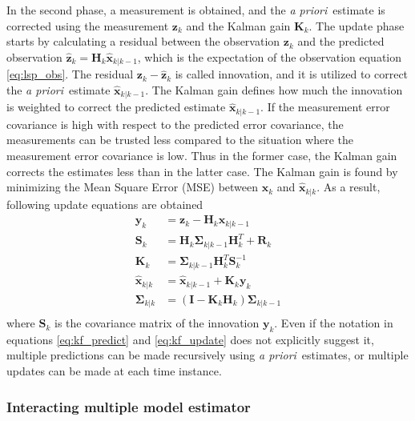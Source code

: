 \documentclass[english, 12pt, a4paper, elec, utf8, a-1b, online]{aaltothesis}
\renewcommand{\vec}[1]{\mathbf{#1}}
\newcommand{\inv}[1]{#1^{-1}}
\newcommand{\xprior}{\hat{\vec{x}}_{k|k-1}}
\newcommand{\xpost}{\hat{\vec{x}}_{k|k}}
\newcommand{\priorecov}{\boldsymbol{\Sigma}_{k|k-1}}
\newcommand{\postecov}{\boldsymbol{\Sigma}_{k|k}}
\newcommand{\prefitinnov}{\vec{y}_k}
\newcommand{\x}{\vec{x}_k}
\newcommand{\z}{\vec{z}_k}
\newcommand{\omodel}{\vec{H}_k}
\newcommand{\ocov}{\vec{R}_k}
\newcommand{\innocov}{\vec{S}_k}
\newcommand{\eye}{\vec{I}}
\newcommand{\gain}{\vec{K}_k}
\def\prior{\textit{a priori}\ }
\newcommand{\zhat}{\hat{\vec{z}}_k}
\begin{document}
In the second phase, a measurement is obtained, and the \prior estimate is corrected using the measurement $\z$ and the Kalman gain $\gain$.
The update phase starts by calculating a residual between the observation $\z$ and the predicted observation $\zhat = \omodel \xprior$, which is the expectation of the observation equation \eqref{eq:lsp_obs}.
The residual $\z-\zhat$ is called innovation, and it is utilized to correct the \prior estimate $\xprior$.
The Kalman gain defines how much the innovation is weighted to correct the predicted estimate $\xprior$.
If the measurement error covariance is high with respect to the predicted error covariance, the measurements can be trusted less compared to the situation where the measurement error covariance is low.
Thus in the former case, the Kalman gain corrects the estimates less than in the latter case.
The Kalman gain is found by minimizing the Mean Square Error (MSE) between $\x$ and $\xpost$.
As a result, following update equations are obtained \cite{Zarchan2000}
\begin{subequations}
\label{eq:kf_update}
\begin{align}
    \prefitinnov &= \z - \omodel \xprior \label{eq:kf_prefit_innov}\\ 
    \innocov &= \omodel \priorecov \omodel^T + \ocov \label{eq:kf_innov_cov}\\ 
    \gain &= \priorecov \omodel^T \inv{\innocov} \label{eq:kf_gain}\\ 
    \xpost &= \xprior + \gain \prefitinnov \label{eq:kf_update_x}\\ 
    \postecov &= \left( \eye - \gain \omodel \right) \priorecov  \label{eq:kf_post_error_cov}\\
\end{align}
\end{subequations}
where $\innocov$ is the covariance matrix of the innovation $\prefitinnov$. 
Even if the notation in equations \eqref{eq:kf_predict} and \eqref{eq:kf_update} does not explicitly suggest it, multiple predictions can be made recursively using \prior estimates, or multiple updates can be made at each time instance.

\subsubsection{Interacting multiple model estimator}
\label{sec:IMM}
\end{document}
